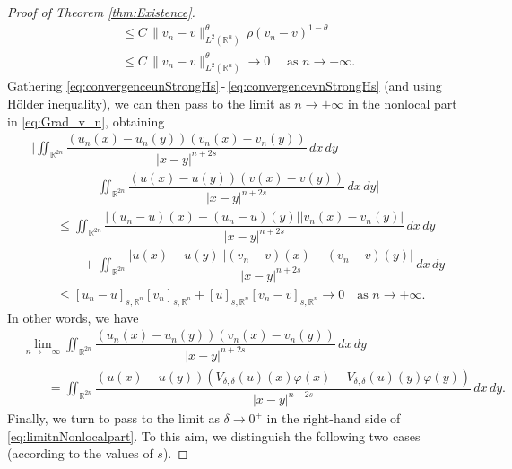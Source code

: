 \documentclass[11pt,a4paper]{amsart}
\def \R {\mathbb{R}}
\theoremstyle{definition}
\theoremstyle{plain}
\numberwithin{equation}{section}
\begin{document}
{\begin{proof}[Proof of Theorem \ref{thm:Existence}]
\begin{equation}
\begin{split}
	& \leq C\,\|v_n-v\|_{L^{2}(\mathbb{R}^{n})}^{\theta}\,\rho(v_n-v)^{1-\theta}\\
	& \leq C\,\|v_n-v\|_{L^{2}(\mathbb{R}^{n})}^{\theta}
	\to 0 \quad \textrm{ as } n \to +\infty.
	\end{split}
\end{equation}
Gathering \eqref{eq:convergenceunStrongHs}\,-\,\eqref{eq:convergencevnStrongHs}
(and using H\"older inequality), 
we can then pass to the limit as $n\to+\infty$ in the nonlocal
part in \eqref{eq:Grad_v_n}, obtaining
\begin{align*}
 & \Big|\iint_{\R^{2n}}\dfrac{(u_n(x)-u_n(y))(v_n(x)-v_n(y))}{|x-y|^{n+2s}}\,dx\,dy
 \\
 & \qquad\qquad - \iint_{\R^{2n}}\dfrac{(u(x)-u(y))(v(x)-v(y))}{|x-y|^{n+2s}}\,dx\,dy\Big| \\
 & \qquad\leq 
 \iint_{\R^{2n}}\dfrac{|(u_n-u)(x)-(u_n-u)(y)||v_n(x)-v_n(y)|}{|x-y|^{n+2s}}\,dx\,dy\\
 &\qquad\qquad
 + \iint_{\R^{2n}}\dfrac{|u(x)-u(y)||(v_n-v)(x)-(v_n-v)(y)|}{|x-y|^{n+2s}}\,dx\,dy\\[0.15cm]
 & \qquad
 \leq [u_n-u]_{s,\R^n}[v_n]_{s,\R^n}+[u]_{s,\R^n}[v_n-v]_{s,\R^n}\to 0\quad\text{as $n\to+\infty$}.
\end{align*}
In other words, we have
\begin{equation} \label{eq:limitnNonlocalpart}
\begin{split}
 & \lim_{n\to+\infty}\iint_{\R^{2n}}\dfrac{(u_n(x)-u_n(y))(v_n(x)-v_n(y))}{|x-y|^{n+2s}}\,dx\,dy
 \\
 &\qquad
 = 
 \iint_{\R^{2n}}\dfrac{(u(x)-u(y))(V_{\delta,\delta}(u)(x)\varphi(x)-
  V_{\delta,\delta}(u)(y)\varphi(y))}{|x-y|^{n+2s}}\,dx\,dy.
 \end{split}
\end{equation}
Finally, we turn to pass to the limit as $\delta\to 0^+$ in the right-hand side of 
\eqref{eq:limitnNonlocalpart}. To this aim, we distinguish the following two cases (according
to the values of $s$).
\medskip


\end{proof}}
\end{document}
